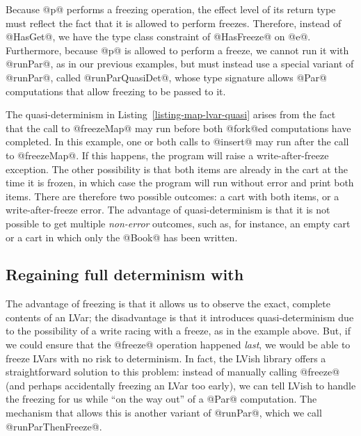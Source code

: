 Because @p@ performs a freezing operation, the effect level of its
return type must reflect the fact that it is allowed to perform
freezes.  Therefore, instead of @HasGet@, we have the type class
constraint of @HasFreeze@ on @e@.  Furthermore, because @p@ is allowed
to perform a freeze, we cannot run it with @runPar@, as in our
previous examples, but must instead use a special variant of @runPar@,
called @runParQuasiDet@, whose type signature allows @Par@
computations that allow freezing to be passed to it.

The quasi-determinism in Listing~\ref{listing-map-lvar-quasi} arises
from the fact that the call to @freezeMap@ may run before both
@fork@ed computations have completed.  In this example, one or both
calls to @insert@ may run after the call to @freezeMap@.  If this
happens, the program will raise a write-after-freeze exception.  The
other possibility is that both items are already in the cart at the
time it is frozen, in which case the program will run without error
and print both items.  There are therefore two possible outcomes: a
cart with both items, or a write-after-freeze error.  The advantage of
quasi-determinism is that it is not possible to get multiple
\emph{non-error} outcomes, such as, for instance, an empty cart or a
cart in which only the @Book@ has been written.

\subsection{Regaining full determinism with }\label{subsection:lvish-regaining-full-determinism-with-runparthenfreeze}

The advantage of freezing is that it allows us to observe the exact,
complete contents of an LVar; the disadvantage is that it introduces
quasi-determinism due to the possibility of a write racing with a
freeze, as in the example above.  But, if we could ensure that the
@freeze@ operation happened \emph{last}, we would be able to freeze
LVars with no risk to determinism.  In fact, the LVish library offers
a straightforward solution to this problem: instead of manually
calling @freeze@ (and perhaps accidentally freezing an LVar too
early), we can tell LVish to handle the freezing for us while ``on the
way out'' of a @Par@ computation.  The mechanism that allows this is
another variant of @runPar@, which we call @runParThenFreeze@.

\singlespacing

\doublespacing

